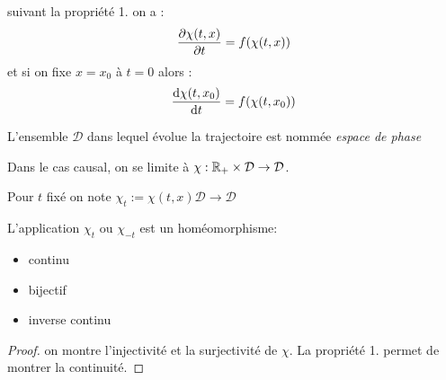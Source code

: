 \documentclass[main.tex]{subfiles}
\begin{document}
  \begin{rem}
    suivant la propriété 1. on a :
    \[
      \derivp[\chi(t,x)]{t} = f(\chi(t,x))
    \]
    et si on fixe $x=x_0$ à $t=0$ alors :
    \[
      \deriv[\chi(t,x_0)]{t}= f(\chi(t,x_0))
    \]
  \end{rem}
  \begin{defin}
    L'ensemble $\mathcal{D}$ dans lequel évolue la trajectoire est nommée \emph{espace de phase}

    Dans le cas causal, on se limite à
    $ \chi: \R_+ \times \mathcal{D} \to \mathcal{D}$.

    Pour $t$ fixé on note $\chi_t :=\chi(t,x) \mathcal{D}\to \mathcal{D}$
  \end{defin}
\begin{prop}
  L'application  $\chi_t$ ou $\chi_{-t}$ est un homéomorphisme:
  \begin{itemize}
  \item continu
  \item bijectif
  \item inverse continu
\end{itemize}

\end{prop}
\begin{proof}
  on montre l'injectivité et la surjectivité de $\chi$.
  La propriété 1. permet de montrer la continuité.
\end{proof}
\end{document}
